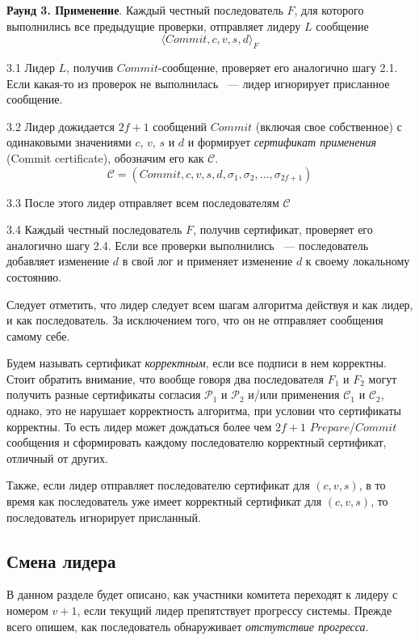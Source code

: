 \textbf{Раунд 3. Применение}.
Каждый честный последователь $F$, для которого выполнились все предыдущие проверки, отправляет лидеру $L$ сообщение 
\[ \langle Commit, c, v, s, d \rangle_F \]

3.1 Лидер $L$, получив $Commit$-сообщение, проверяет его аналогично шагу 2.1.
Если какая-то из проверок не выполнилась ~--- лидер игнорирует присланное сообщение. 

3.2 Лидер дожидается $2f+1$ сообщений $Commit$ (включая свое собственное) с одинаковыми значениями $c$, $v$, $s$ и $d$ и формирует \textit{сертификат применения} (Commit certificate), обозначим его как $\mathcal{C}$.
$$\mathcal{C}=(Commit, c, v, s, d, \sigma_1, \sigma_2, ..., \sigma_{2f+1})$$

3.3 После этого лидер отправляет всем последователям  $\mathcal{C}$

3.4 Каждый честный последователь $F$, получив сертификат, проверяет его аналогично шагу 2.4.
Если все проверки выполнились ~--- последователь добавляет изменение $d$ в свой лог и  применяет изменение $d$ к своему локальному состоянию.
\vspace{10pt}

Следует отметить, что лидер следует всем шагам алгоритма действуя и как лидер, и как последователь. За исключением того, что он не отправляет сообщения самому себе.

Будем называть сертификат \textit{корректным}, если все подписи в нем корректны.
Стоит обратить внимание, что вообще говоря два последователя $F_1$ и $F_2$ могут получить разные сертификаты согласия $\mathcal{P}_1$ и $\mathcal{P}_2$ и/или применения $\mathcal{C}_1$ и $\mathcal{C}_2$, однако, это не нарушает корректность алгоритма, при условии что сертификаты корректны.
То есть лидер может дождаться более чем $2f+1$ $Prepare$/$Commit$ сообщения и сформировать каждому последователю корректный сертификат, отличный от других.

Также, если лидер отправляет последователю сертификат для $(c, v, s)$, в то время как последователь уже имеет корректный сертификат для $(c, v, s)$, то последователь игнорирует присланный.

\subsection{Смена лидера} \label{leader-change}
В данном разделе будет описано, как участники комитета переходят к лидеру с номером $v+1$, если текущий лидер препятствует прогрессу системы. Прежде всего опишем, как последователь обнаруживает \textit{отстутствие прогресса}.


